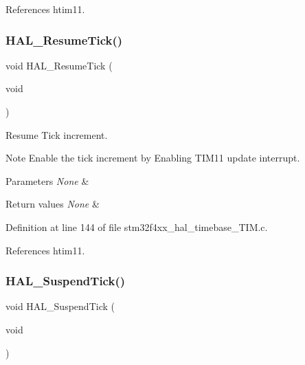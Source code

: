 References htim11.

\mbox{\label{group___h_a_l___time_base_ga24e0ee9dae1ec0f9d19200f5575ff790}} 
\subsubsection{\texorpdfstring{H\+A\+L\+\_\+\+Resume\+Tick()}{HAL\_ResumeTick()}}
{\footnotesize\ttfamily void H\+A\+L\+\_\+\+Resume\+Tick (\begin{DoxyParamCaption}\item[{void}]{ }\end{DoxyParamCaption})}



Resume Tick increment. 

\begin{DoxyNote}{Note}
Enable the tick increment by Enabling T\+I\+M11 update interrupt. 
\end{DoxyNote}

\begin{DoxyParams}{Parameters}
{\em None} & \\
\hline
\end{DoxyParams}

\begin{DoxyRetVals}{Return values}
{\em None} & \\
\hline
\end{DoxyRetVals}


Definition at line 144 of file stm32f4xx\+\_\+hal\+\_\+timebase\+\_\+\+T\+I\+M.\+c.



References htim11.

\mbox{\label{group___h_a_l___time_base_gaaf651af2afe688a991c657f64f8fa5f9}} 
\subsubsection{\texorpdfstring{H\+A\+L\+\_\+\+Suspend\+Tick()}{HAL\_SuspendTick()}}
{\footnotesize\ttfamily void H\+A\+L\+\_\+\+Suspend\+Tick (\begin{DoxyParamCaption}\item[{void}]{ }\end{DoxyParamCaption})}



